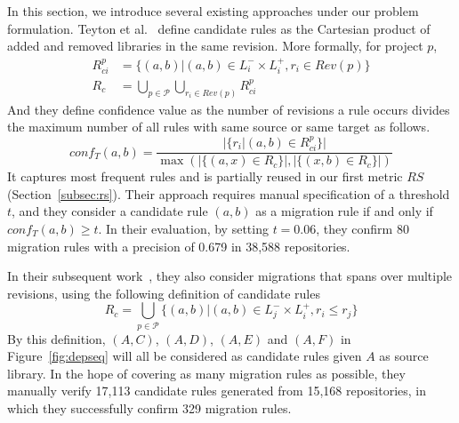 \documentclass[conference, 10pt]{IEEEtran}
\begin{document}
In this section, we introduce several existing approaches under our problem formulation. %
Teyton et al.~\cite{2012WCRE-Teyton-Mining} define candidate rules as the Cartesian product of added and removed libraries in the same revision. More formally, for project $p$,
\begin{align}
  \label{eq:cand-teyton2012}
  R_{ci}^p &= \{(a,b)|(a,b)\in  L_i^- \times  L_i^+, r_i \in Rev(p)\} \\
  R_c &= \bigcup_{p\in\mathcal{P}}\bigcup_{r_i\in Rev(p)} R_{ci}^p
\end{align}
And they define confidence value as the number of revisions a rule occurs divides the maximum number of all rules with same source or same target as follows.
\begin{equation}
\label{eq:conf-teyton}
    conf_T(a,b)=\frac{|\{r_i|(a,b)\in R_{ci}^p\}|}{\max(|\{(a,x)\in R_c\}|, |\{(x,b)\in R_c\}|)}
\end{equation}
It captures most frequent rules and is partially reused in our first metric $RS$ (Section~\ref{subsec:rs}).
Their approach requires manual specification of a threshold $t$, and they consider a candidate rule $(a,b)$ as a migration rule if and only if $conf_T(a,b)\ge t$. 
In their evaluation, by setting $t=0.06$, they confirm 80 migration rules with a precision of 0.679 in 38,588 repositories.

In their subsequent work~\cite{2014JournalOfSysAndSoft-Teyton-Study}, they also consider migrations that spans over multiple revisions, using the following definition of candidate rules
\begin{equation}
\label{eq:cand-teyton}
R_c=\bigcup_{p\in\mathcal{P}}\{(a,b)|(a,b)\in L_j^- \times  L_i^+, r_i\le r_j\}
\end{equation}
By this definition, $(A,C)$, $(A,D)$, $(A,E)$ and $(A,F)$ in Figure~\ref{fig:depseq} will all be considered as candidate rules given $A$ as source library. 
In the hope of covering as many migration rules as possible, they manually verify 17,113 candidate rules generated from 15,168 repositories, in which they successfully confirm 329 migration rules.
\end{document}
